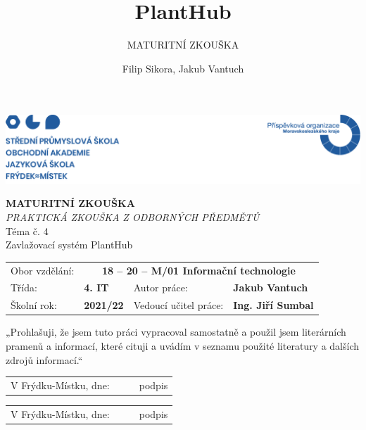 \documentclass[12pt,a4paper]{article}
\title{PlantHub}
\subtitle{MATURITNÍ ZKOUŠKA }
\author{Filip Sikora, Jakub Vantuch}
\date{}
\begin{document}
\renewcommand\refname{}

\begin{titlepage}
	\noindent\includegraphics[width=\linewidth]{header.png}
	\begin{center}
		\vspace*{0.2cm}
		\Huge\textbf{MATURITNÍ ZKOUŠKA}
		\vspace*{1cm} \\
		\large \emph{PRAKTICKÁ ZKOUŠKA Z ODBORNÝCH PŘEDMĚTŮ}
		\vspace*{1cm} \\
		\Large Téma č. 4 \\
		\vspace*{1cm}
		\Large Zavlažovací systém PlantHub \\
		\vspace*{1.3cm}
		\normalsize
	\end{center}
	\begin{tabularx}{\textwidth}{l@{\hskip 0.5cm}XXl}
		Obor vzdělání: & \multicolumn{3}{c}{\textbf{18 – 20 – M/01 Informační technologie}} \\[10pt]
		Třída: & \textbf{4. IT} & Autor práce: & \textbf{Jakub Vantuch} \\[10pt]
		Školní rok: & \textbf{2021/22} & Vedoucí učitel práce: & \textbf{Ing. Jiří Sumbal}
		\vspace*{2cm}
	\end{tabularx}
	„Prohlašuji, že jsem tuto práci vypracoval samostatně a použil jsem literárních pramenů a informací, které cituji a uvádím v seznamu použité literatury a dalších zdrojů informací.“

	\noindent\begin{tabularx}{\textwidth}{l@{\hskip 0.5cm}XXl}
		\\[10pt]
		V Frýdku-Místku, dne: & \textbf{\dotfill}
		                      &
		\textbf{\dotfill}     & podpis
	\end{tabularx}
	
	\noindent\begin{tabularx}{\textwidth}{l@{\hskip 0.5cm}XXl}
		\\[10pt]
		V Frýdku-Místku, dne: & \textbf{\dotfill}
		                      &
		\textbf{\dotfill}     & podpis
	\end{tabularx}
\end{titlepage}
\end{document}
